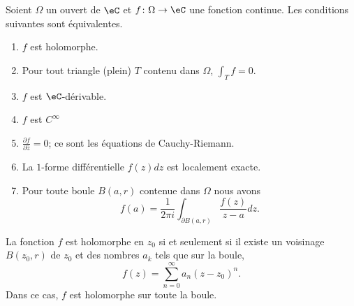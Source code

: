 \begin{theorem}
    Soient \( \Omega\) un ouvert de \( \eC\) et \( f\colon \Omega\to \eC\) une fonction continue. Les conditions suivantes sont équivalentes.
    \begin{enumerate}
        \item   \label{ItemOtPcTb}
            \( f\) est holomorphe.
        \item   \label{ItemHWRnxx}
            Pour tout triangle (plein) \( T\) contenu dans \( \Omega\), \( \int_Tf=0\).
        \item   \label{ItempBBPVv}
            \( f\) est \( \eC\)-dérivable.
        \item   \label{ItemmLhzbB}
            \( f\) est \(  C^{\infty}\)
        \item   \label{ItemCCrSrLj}
            \( \frac{ \partial f }{ \partial \bar z }=0\); ce sont les équations de Cauchy-Riemann.
        \item   \label{ItemEvxRSn}
            La \( 1\)-forme différentielle \( f(z)dz\) est localement exacte.
        \item   \label{ItemVSCHtY}
            Pour toute boule \( B(a,r)\) contenue dans \( \Omega\) nous avons
            \begin{equation}
                f(a)=\frac{1}{ 2\pi i }\int_{\partial B(a,r)}\frac{ f(z) }{ z-a }dz.
            \end{equation}
    \end{enumerate}

    La fonction \( f\) est holomorphe en \( z_0\) si et seulement si il existe un voisinage \( B(z_0,r)\) de \( z_0\) et des nombres \( a_k\) tels que sur la boule,
    \begin{equation}
        f(z)=\sum_{n=0}^{\infty}a_n(z-z_0)^n.
    \end{equation}
    Dans ce cas, \( f\) est holomorphe sur toute la boule.
\end{theorem}

